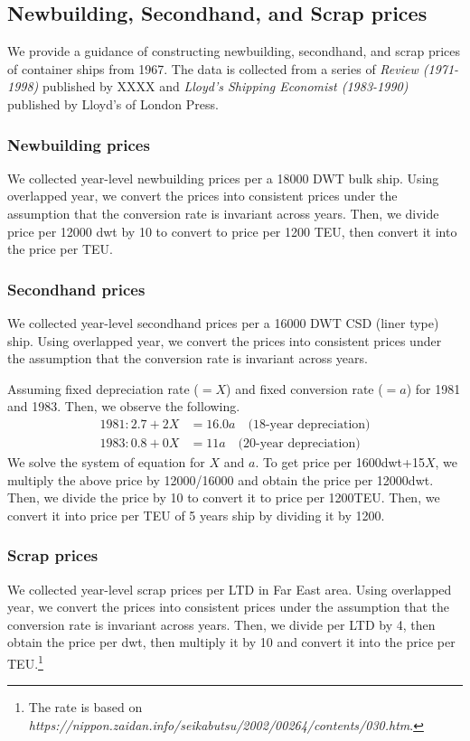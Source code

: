 \subsection{Newbuilding, Secondhand, and Scrap prices}
We provide a guidance of constructing newbuilding, secondhand, and scrap prices of container ships from 1967. The data is collected from a series of \textit{Review (1971-1998)} published by XXXX and \textit{Lloyd's Shipping Economist (1983-1990)} published by Lloyd's of London Press. 

\subsubsection{Newbuilding prices}
We collected year-level newbuilding prices per a 18000 DWT bulk ship. Using overlapped year, we convert the prices into consistent prices under the assumption that the conversion rate is invariant across years. Then, we divide price per 12000 dwt by 10 to convert to price per 1200 TEU, then convert it into the price per TEU.

\subsubsection{Secondhand prices}
We collected year-level secondhand prices per a 16000 DWT CSD (liner type) ship. Using overlapped year, we convert the prices into consistent prices under the assumption that the conversion rate is invariant across years.

Assuming fixed depreciation rate ($= X$) and fixed conversion rate ($= a$) for 1981 and 1983. Then, we observe the following.
\begin{align*}
    1981: 2.7 + 2X &= 16.0a \quad\text{(18-year depreciation)}\\
    1983: 0.8 + 0X &=11a \quad\text{(20-year depreciation)}
\end{align*}
We solve the system of equation for $X$ and $a$. To get price per 1600dwt+15$X$, we multiply the above price by 12000/16000 and obtain the price per 12000dwt. Then, we divide the price by 10 to convert it to price per 1200TEU. Then, we convert it into price per TEU of 5 years ship by dividing it by 1200.


\subsubsection{Scrap prices}

We collected year-level scrap prices per LTD in Far East area. Using overlapped year, we convert the prices into consistent prices under the assumption that the conversion rate is invariant across years. 
Then, we divide per LTD by 4, then obtain the price per dwt, then multiply it by 10 and convert it into the price per TEU.\footnote{The rate is based on \textit{https://nippon.zaidan.info/seikabutsu/2002/00264/contents/030.htm}.}

